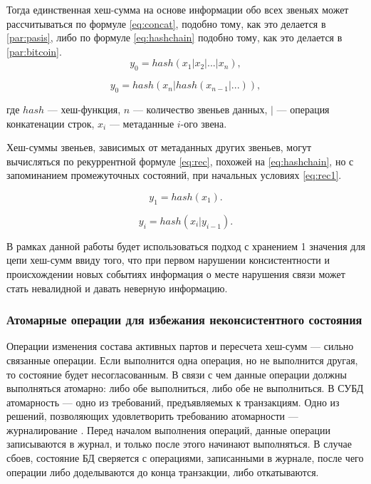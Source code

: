 Тогда единственная хеш-сумма на основе информации обо всех звеньях может рассчитываться по формуле \ref{eq:concat}, подобно тому, как это делается в \ref{par:pasis}, либо по формуле \ref{eq:hashchain} подобно тому, как это делается в \ref{par:bitcoin}.
\begin{equation}
\label{eq:concat}
y_0 = hash(x_1 | x_2 | ... | x_n),
\end{equation}

\begin{equation}
\label{eq:hashchain}
y_0 = hash(x_n | hash(x_{n-1} | ...)),
\end{equation}

где $hash$ --- хеш-функция, $n$ --- количество звеньев данных, $|$ --- операция конкатенации строк, $x_i$ --- метаданные $i$-ого звена.

Хеш-суммы звеньев, зависимых от метаданных других звеньев, могут вычисляться по рекуррентной формуле \ref{eq:rec}, похожей на \ref{eq:hashchain}, но с запоминанием промежуточных состояний, при начальных условиях \ref{eq:rec1}.

\begin{equation}
\label{eq:rec}
y_1 = hash(x_1).
\end{equation}

\begin{equation}
\label{eq:rec1}
y_i = hash(x_i|y_{i-1}).
\end{equation}


В рамках данной работы будет использоваться подход с хранением 1 значения для цепи хеш-сумм ввиду того, что при первом нарушении консистентности и происхождении новых событиях информация о месте нарушения связи может стать невалидной и давать неверную информацию.

\subsubsection{Атомарные операции для избежания неконсистентного состояния}

Операции изменения состава активных партов и пересчета хеш-сумм --- сильно связанные операции. Если выполнится одна операция, но не выполнится другая, то состояние будет несогласованным. В связи с чем данные операции должны выполняться атомарно: либо обе выполниться, либо обе не выполниться. В СУБД атомарность \cite{atomicity} --- одно из требований, предъявляемых к транзакциям. Одно из решений, позволяющих удовлетворить требованию атомарности --- журналирование \cite{journaldbms}. Перед началом выполнения операций, данные операции записываются в журнал, и только после этого начинают выполняться. В случае сбоев, состояние БД сверяется с операциями, записанными в журнале, после чего операции либо доделываются до конца транзакции, либо откатываются.

